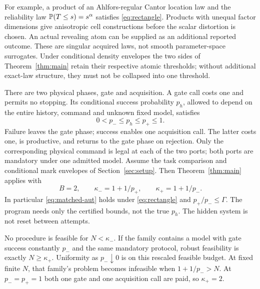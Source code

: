For example, a product of an Ahlfors-regular Cantor location law and the reliability law $\mathbb P(T\le s)=s^\alpha$ satisfies \eqref{eq:rectangle}. Products with unequal factor dimensions give anisotropic cell constructions before the scalar distortion is chosen. An actual revealing atom can be supplied as an additional reported outcome. These are singular acquired laws, not smooth parameter-space surrogates. Under conditional density envelopes the two sides of Theorem~\ref{thm:main} retain their respective atomic thresholds; without additional exact-law structure, they must not be collapsed into one threshold.

\begin{theorem}\label{thm:herald}
There are two physical phases, gate and acquisition. A gate call costs one and permits no stopping. Its conditional success probability $p_h$, allowed to depend on the entire history, command and unknown fixed model, satisfies
\[
 0<p_-\le p_h\le p_+\le1.
\]
Failure leaves the gate phase; success enables one acquisition call. The latter costs one, is productive, and returns to the gate phase on rejection. Only the corresponding physical command is legal at each of the two ports; both ports are mandatory under one admitted model. Assume the task comparison and conditional mark envelopes of Section~\ref{sec:setup}. Then Theorem~\ref{thm:main} applies with
\begin{equation}\label{eq:kappa}
 B=2,\qquad \kappa_-=1+1/p_+,\qquad \kappa_+=1+1/p_-.
\end{equation}
In particular \eqref{eq:matched-aut} holds under \eqref{eq:rectangle} and $p_+/p_-\le\Gamma$. The program needs only the certified bounds, not the true $p_h$. The hidden system is not reset between attempts.

No procedure is feasible for $N<\kappa_-$. If the family contains a model with gate success constantly $p_-$ and the same mandatory protocol, robust feasibility is exactly $N\ge\kappa_+$. Uniformity as $p_-\downarrow0$ is on this rescaled feasible budget. At fixed finite $N$, that family's problem becomes infeasible when $1+1/p_->N$. At $p_-=p_+=1$ both one gate and one acquisition call are paid, so $\kappa_+=2$.
\end{theorem}
